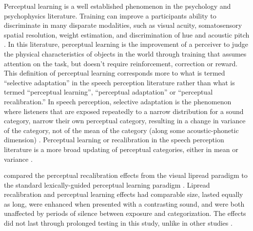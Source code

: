 Perceptual learning is a well established phenomenon in the psychology and psychophysics literature. 
Training can improve a participants ability to discriminate in many disparate modalities, such as visual acuity, somatosensory spatial resolution, weight estimation, and discrimination of hue and acoustic pitch \citep[for review]{Gibson1953}. 
 In this literature, perceptual learning is the improvement of a perceiver to judge the physical characteristics of objects in the world through training that assumes attention on the task, but doesn't require reinforcement, correction or reward.
This definition of perceptual learning corresponds more to what is termed ``selective adaptation'' in the speech perception literature rather than what is termed ``perceptual learning'', ``perceptual adaptation'' or ``perceptual recalibration.''  
In speech perception, selective adaptation is the phenomenon where listeners that are exposed repeatedly to a narrow distribution for a sound category, narrow their own perceptual category, resulting in a change in variance of the category, not of the mean of the category (along some acoustic-phonetic dimension) \citep{Eimas1973,Samuel1986,Vroomen2007}.
Perceptual learning or recalibration in the speech perception literature is a more broad updating of perceptual categories, either in mean or variance \citep{Norris2003, Vroomen2007}.








\citet{vanLinden2007} compared the perceptual recalibration effects from the visual lipread paradigm \citep{Bertelson2003} to the standard lexically-guided perceptual learning paradigm \citep{Norris2003}.  
Lipread recalibration and perceptual learning effects had comparable size, lasted equally as long, were enhanced when presented with a contrasting sound, and were both unaffected by periods of silence between exposure and categorization.  
The effects did not last through prolonged testing in this study, unlike in other studies \citep{Kraljic2005,Eisner2006}.

